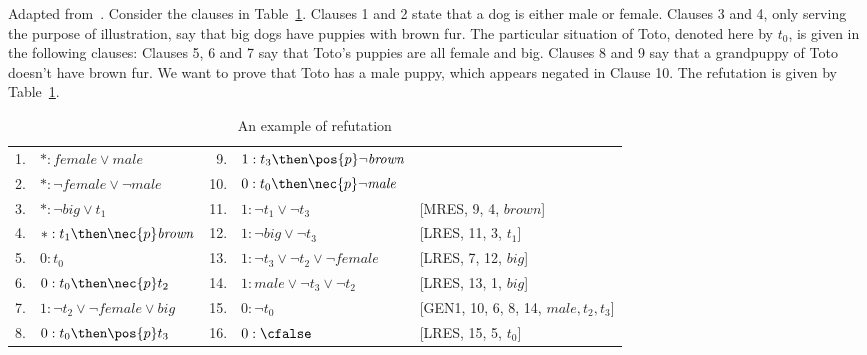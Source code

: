 \begin{example}
    Adapted from~\cite{Areces:1999:PRR,nalon2015modal}. Consider the clauses in
    Table~\ref{tab:calcunsat}. Clauses 1 and 2 state that a dog is either
    male or female. Clauses 3 and 4, only serving the purpose of illustration,
    say that big dogs have puppies with brown fur. The particular situation
    of Toto, denoted here by $t_0$, is given in the following clauses: Clauses
    5, 6 and 7 say that Toto's puppies are all female and big. Clauses 8 and 9
    say that a grandpuppy of Toto doesn't have brown fur. We want to prove that
    Toto has a male puppy, which appears negated in Clause 10. The refutation is
    given by Table~\ref{tab:calcunsat}. 

    \begin{table}[h!]%
        \caption{An example of refutation}
        \centering%
        \begin{tabular}{rlrll}
            1.&$* : \mathit{female} \lor \mathit{male}$           & 9. &$1 : t_3 \then \pos{p} \neg \mathit{brown}$            & \\
            2.&$* : \neg \mathit{female} \lor \neg \mathit{male}$ & 10.&$0 : t_0 \then \nec{p} \neg \mathit{male}$             & \\ 
            3.&$* : \neg \mathit{big} \lor t_1$                   & 11.&$1 : \neg t_1 \lor \neg t_3$                           & [MRES, 9, 4, $\mathit{brown}$]\\
            4.&$* : t_1 \then \nec{p} \mathit{brown}$             & 12.&$1 : \neg \mathit{big} \lor \neg t_3$                  & [LRES, 11, 3, $t_1$]\\
            5.&$0 : t_0$                                          & 13.&$1 : \neg t_3 \lor \neg t_2 \lor \neg \mathit{female}$ & [LRES, 7, 12, $\mathit{big}$]\\
            6.&$0 : t_0 \then \nec{p} t_2$                        & 14.&$1 : \mathit{male} \lor \neg t_3 \lor \neg t_2$        & [LRES, 13, 1, $\mathit{big}$]\\
            7.&$1 : \neg t_2 \lor \neg \mathit{female} \lor \mathit{big}$ & 15.&$0 : \neg t_0$ & [GEN1, 10, 6, 8, 14, $\mathit{male},t_2,t_3$]\\
            8.&$0 : t_0 \then \pos{p} t_3$                        & 16.&$0 : \cfalse$ & [LRES, 15, 5, $t_0$]\\
       \end{tabular}%
        \label{tab:calcunsat}
    \end{table}
\end{example}

